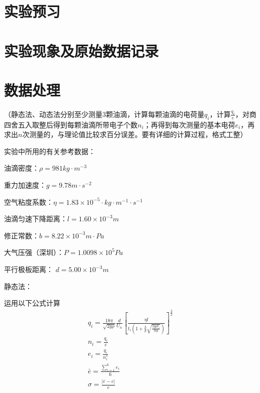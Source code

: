 \documentclass[signature=data]{physicsreport}
\begin{document}
\maketitle

\section{实验预习}


\makeatletter
{}
\makeatother


\section{实验现象及原始数据记录}


\makeatletter
{}
\makeatother

\newpage
\section{数据处理}

    （静态法、动态法分别至少测量$3$颗油滴，计算每颗油滴的电荷量$q_i$，计算$\frac{q_i}{e}$，对商四舍五入取整后得到每颗油滴所带电子个数$n_i$；再得到每次测量的基本电荷$e_i$，再求出$n$次测量的，与理论值比较求百分误差。要有详细的计算过程，格式工整）
    
    实验中所用的有关参考数据：
    
油滴密度：$\rho=981 kg·m^{-3}$

重力加速度：$g=9.78 m·s^{-2}$

空气粘度系数：$\eta=1.83×10^{-5}·kg·m^{-1}·s^{-1}$

油滴匀速下降距离：$l=1.60×10^{-3}m$

修正常数：$b=8.22×10^{-3}m·Pa$

大气压强（深圳）：$P=1.0098×10^{5} Pa$

平行极板距离：	$d=5.00×10^{-3}m$

\vspace{2em}
静态法：

运用以下公式计算
$$
\begin{array}{c}q_{i}=\frac{18 \pi}{\sqrt{2 g \rho}} \frac{d}{U_{n}}\left[\frac{\eta l}{t_{i}\left(1+\frac{b}{p} \sqrt{\frac{2 g \rho t_{i}}{9 \eta l}}\right)}\right]^{\frac{3}{2}} \\n_{i}=\frac{q_{i}}{e} \\e_{i}=\frac{q_{i}}{n_{i}^{*}} \\\bar{e}=\frac{\sum_{i=1}^{6} e_{i}}{6} \\\sigma=\frac{|\bar{e}-e|}{e}\end{array}
$$
\end{document}

